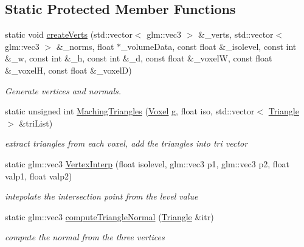 \subsection*{Static Protected Member Functions}
\begin{DoxyCompactItemize}
\item 
static void \hyperlink{classMachingCube_a03fe138d339db08d8f8deec1adb9eaef}{create\+Verts} (std\+::vector$<$ glm\+::vec3 $>$ \&\+\_\+verts, std\+::vector$<$ glm\+::vec3 $>$ \&\+\_\+norms, float $\ast$\+\_\+volume\+Data, const float \&\+\_\+isolevel, const int \&\+\_\+w, const int \&\+\_\+h, const int \&\+\_\+d, const float \&\+\_\+voxelW, const float \&\+\_\+voxelH, const float \&\+\_\+voxelD)\hypertarget{classMachingCube_a03fe138d339db08d8f8deec1adb9eaef}{}\label{classMachingCube_a03fe138d339db08d8f8deec1adb9eaef}

\begin{DoxyCompactList}\small\item\em Generate vertices and normals. \end{DoxyCompactList}\item 
static unsigned int \hyperlink{classMachingCube_a7a07c3e38877815f4bbe3d010b869e5c}{Maching\+Triangles} (\hyperlink{structVoxel}{Voxel} g, float iso, std\+::vector$<$ \hyperlink{structTriangle}{Triangle} $>$ \&tri\+List)\hypertarget{classMachingCube_a7a07c3e38877815f4bbe3d010b869e5c}{}\label{classMachingCube_a7a07c3e38877815f4bbe3d010b869e5c}

\begin{DoxyCompactList}\small\item\em extract triangles from each voxel, add the triangles into tri vector \end{DoxyCompactList}\item 
static glm\+::vec3 \hyperlink{classMachingCube_a09743e696d8b28797bafbfdb55df415c}{Vertex\+Interp} (float isolevel, glm\+::vec3 p1, glm\+::vec3 p2, float valp1, float valp2)\hypertarget{classMachingCube_a09743e696d8b28797bafbfdb55df415c}{}\label{classMachingCube_a09743e696d8b28797bafbfdb55df415c}

\begin{DoxyCompactList}\small\item\em intepolate the intersection point from the level value \end{DoxyCompactList}\item 
static glm\+::vec3 \hyperlink{classMachingCube_a96ce7dcf9383947e09c9bcb61302f2f7}{compute\+Triangle\+Normal} (\hyperlink{structTriangle}{Triangle} \&itr)\hypertarget{classMachingCube_a96ce7dcf9383947e09c9bcb61302f2f7}{}\label{classMachingCube_a96ce7dcf9383947e09c9bcb61302f2f7}

\begin{DoxyCompactList}\small\item\em compute the normal from the three vertices \end{DoxyCompactList}\end{DoxyCompactItemize}


